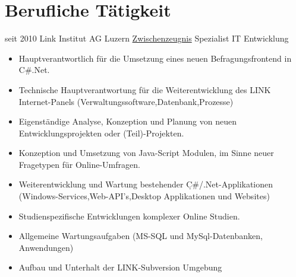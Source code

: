 \documentclass[a4paper]{twentysecondcv} %
\begin{document}
    \makeprofile %
    \hypertarget{work_back}{}
    \section{Berufliche Tätigkeit}
    \begin{twenty}
        \twentyitem
        {seit 2010}
        {}
        {Link Institut AG \textnormal{Luzern}}
        {\hyperlink{link}{\textcolor{pblue}{Zwischenzeugnis}}}
        {Spezialist IT Entwicklung}
        {\begin{itemize}
             \item Hauptverantwortlich für die Umsetzung eines neuen Befragungsfrontend in C\#.Net.
             \item Technische Hauptverantwortung für die Weiterentwicklung des LINK Internet-Panels
             (Verwaltungssoftware,Datenbank,Prozesse)
             \item Eigenständige Analyse, Konzeption und Planung von neuen Entwicklungsprojekten oder (Teil)-Projekten.
             \item Konzeption und Umsetzung von Java-Script Modulen, im Sinne neuer Fragetypen für Online-Umfragen.
             \item Weiterentwicklung und Wartung bestehender C̣\#/.Net-Applikationen (Windows-Services,Web-API's,Desktop Applikationen und Websites)
             \item Studienspezifische Entwicklungen komplexer Online Studien.
             \item Allgemeine Wartungsaufgaben (MS-SQL und MySql-Datenbanken, Anwendungen)
             \item Aufbau und Unterhalt der LINK-Subversion Umgebung
        \end{itemize}}
        \hypertarget{datahouse_back}{}
        \twentyitem        
        {}
        {}
        {}
        {}
        {}
        {}
  

\end{twenty}
\end{document}
